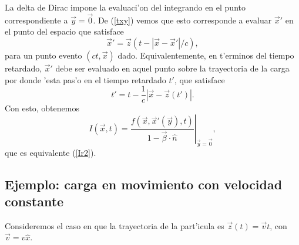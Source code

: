 La delta de Dirac impone la evaluaci'on del integrando en el punto correspondiente a $\vec{y}=\vec{0}$. De (\ref{txy}) vemos que esto corresponde a evaluar $\vec{x}'$ en el punto del espacio que satisface
\begin{equation}
 \vec{x}'=\vec{z}(t-|\vec{x}-\vec{x}'|/c),
\end{equation}
para un punto evento $(ct,\vec{x})$ dado. Equivalentemente, en t'erminos del tiempo retardado, $\vec{x}'$ debe ser evaluado en aquel punto sobre la trayectoria de la carga por donde 'esta pas'o en el tiempo retardado $t'$, que satisface
\begin{equation}
 t'=t-\frac{1}{c}|\vec{x}-\vec{z}(t')|.
\end{equation}
Con esto, obtenemos
\begin{equation}
 I(\vec{x},t)=\left.\frac{f(\vec{x},\vec{x}'(\vec{y}),t)}{ 1-\vec\beta\cdot\hat{n} } \right|_{\vec{y}=\vec{0}},
\end{equation}
que es equivalente (\ref{Ir2}).

\subsection{Ejemplo: carga en movimiento con velocidad constante}
Consideremos el caso en que la trayectoria de la part'icula es $\vec{z}(t)=\vec{v}t$, con $\vec{v}=v\hat{x}$.


